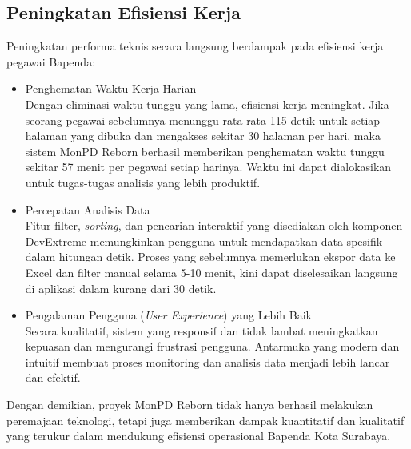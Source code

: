 \subsection{Peningkatan Efisiensi Kerja}
Peningkatan performa teknis secara langsung berdampak pada efisiensi kerja pegawai Bapenda:
\begin{itemize}
    \item Penghematan Waktu Kerja Harian \\
    Dengan eliminasi waktu tunggu yang lama, efisiensi kerja meningkat. Jika seorang pegawai sebelumnya menunggu rata-rata 115 detik untuk setiap halaman yang dibuka dan mengakses sekitar 30 halaman per hari, maka sistem MonPD Reborn berhasil memberikan penghematan waktu tunggu sekitar 57 menit per pegawai setiap harinya. Waktu ini dapat dialokasikan untuk tugas-tugas analisis yang lebih produktif.
    \item Percepatan Analisis Data \\
    Fitur filter, \emph{sorting}, dan pencarian interaktif yang disediakan oleh komponen DevExtreme memungkinkan pengguna untuk mendapatkan data spesifik dalam hitungan detik. Proses yang sebelumnya memerlukan ekspor data ke Excel dan filter manual selama 5-10 menit, kini dapat diselesaikan langsung di aplikasi dalam kurang dari 30 detik.
    \item Pengalaman Pengguna (\emph{User Experience}) yang Lebih Baik \\
    Secara kualitatif, sistem yang responsif dan tidak lambat meningkatkan kepuasan dan mengurangi frustrasi pengguna. Antarmuka yang modern dan intuitif membuat proses monitoring dan analisis data menjadi lebih lancar dan efektif.
\end{itemize}

Dengan demikian, proyek MonPD Reborn tidak hanya berhasil melakukan peremajaan teknologi, tetapi juga memberikan dampak kuantitatif dan kualitatif yang terukur dalam mendukung efisiensi operasional Bapenda Kota Surabaya.

